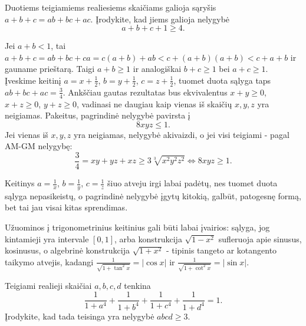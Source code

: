 \begin{pavnr}[St. Petersburg 2009]
  Duotiems teigiamiems realiesiems skaičiams galioja sąryšis
  $a+b+c=ab+bc+ac$. Įrodykite, kad jiems galioja nelygybė $$a+b+c+1\geq4.$$
\end{pavnr}

\begin{sprendimas}
  Jei $a+b<1$, tai $a+b+c=ab+bc+ca=c(a+b)+ab< c+(a+b)(a+b) < c+a+b$ ir
  gauname prieštarą. Taigi $a+b\geq1$ ir analogiškai $b+c\geq1$ bei
  $a+c\geq1$. Įveskime keitinį $a=x+\frac{1}{2}$, $b=y+\frac{1}{2}$,
  $c=z+\frac{1}{2}$, tuomet duota sąlyga taps $ab+bc+ac=\frac{3}{4}$.
  Ankščiau gautas rezultatas bus ekvivalentus $x+y\geq0$, $x+z\geq0$,
  $y+z\geq0$, vadinasi ne daugiau kaip vienas iš skaičių $x,y,z$ yra
  neigiamas. Pakeitus, pagrindinė nelygybė pavirsta į $$8xyz\leq1.$$ Jei
  vienas iš $x,y,z$ yra neigiamas, nelygybė akivaizdi, o jei visi teigiami -
  pagal AM-GM nelygybę:
  $$\frac{3}{4}=xy+yz+xz\geq3\sqrt[3]{x^2y^2z^2}\Leftrightarrow 8xyz\geq1.$$
\end{sprendimas}

\begin{pastaba}
  Keitinys $a=\frac{1}{x}$, $b=\frac{1}{y}$, $c=\frac{1}{z}$ šiuo atveju
  irgi labai padėtų, nes tuomet duota sąlyga nepasikeistų, o pagrindinė
  nelygybė įgytų kitokią, galbūt, patogesnę formą, bet tai jau visai kitas
  sprendimas.
\end{pastaba}

Užuominos į trigonometrinius keitinius gali būti labai įvairios: sąlyga,
jog kintamieji yra intervale $[0,1]$, arba konstrukcija $\sqrt{1-x^2}$
sufleruoja apie sinusus, kosinusus, o algebrinė konstrukcija $\sqrt{1+x^2}$
- tipinis tangeto ar kotangento taikymo atvejis, kadangi
$\frac{1}{\sqrt{1+\tan^2x}}=|\cos x|$ ir $\frac{1}{\sqrt{1+\cot^2x}}=|\sin
x|$.

\begin{pavnr}[Latvia 2002]
  Teigiami realieji skaičiai $a,b,c,d$ tenkina
  $$\frac{1}{1+a^4}+\frac{1}{1+b^4}+\frac{1}{1+c^4}+\frac{1}{1+d^4}=1.$$
  Įrodykite, kad tada teisinga yra nelygybė $abcd\geq3.$
\end{pavnr}

